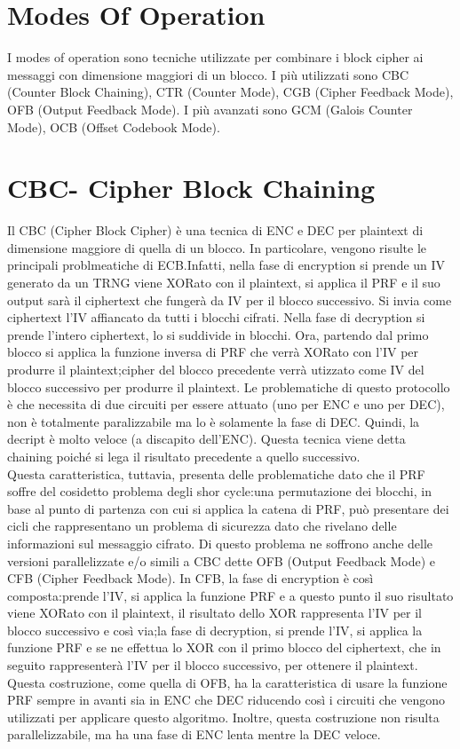 \documentclass[a4paper,draft]{article}
\begin{document}
\section{Modes Of Operation}
I modes of operation sono tecniche utilizzate per combinare i block cipher ai messaggi con dimensione maggiori di un blocco.\newline
I più utilizzati sono CBC (Counter Block Chaining), CTR (Counter Mode), CGB (Cipher Feedback Mode), OFB (Output Feedback Mode)\@. I più avanzati sono GCM (Galois Counter Mode), OCB (Offset Codebook Mode)\@.
\section{CBC- Cipher Block Chaining}
Il CBC (Cipher Block Cipher) è una tecnica di ENC e DEC per plaintext di dimensione maggiore di quella di un blocco. In particolare, vengono risulte le principali problmeatiche di ECB\@.Infatti, nella fase di encryption si prende un IV generato da un TRNG viene XORato con il plaintext, si applica il PRF e il suo output sarà il ciphertext che fungerà da IV per il blocco successivo. Si invia come ciphertext l'IV affiancato da tutti i blocchi cifrati\@. Nella fase di decryption si prende l'intero ciphertext, lo si suddivide in blocchi\@. Ora, partendo dal primo blocco si applica la funzione inversa di PRF che verrà XORato con l'IV per produrre il plaintext;\@il cipher del blocco precedente verrà utizzato come IV del blocco successivo per produrre il plaintext\@. Le problematiche di questo protocollo è che necessita di due circuiti per essere attuato (uno per ENC e uno per DEC), non è totalmente paralizzabile ma lo è solamente la fase di DEC\@. Quindi, la decript è molto veloce (a discapito dell'ENC)\@.\newline
Questa tecnica viene detta chaining poiché si lega il risultato precedente a quello successivo\@.\\
Questa caratteristica, tuttavia, presenta delle problematiche dato che il PRF soffre del cosidetto problema degli shor cycle:\@presa una permutazione dei blocchi, in base al punto di partenza con cui si applica la catena di PRF, può presentare dei cicli che rappresentano un problema di sicurezza dato che rivelano delle informazioni sul messaggio cifrato\@.\newline
Di questo problema ne soffrono anche delle versioni parallelizzate e/o simili a CBC dette OFB (Output Feedback Mode) e CFB (Cipher Feedback Mode)\@.\newline
In CFB, la fase di encryption è così composta:\@si prende l'IV, si applica la funzione PRF e a questo punto il suo risultato viene XORato con il plaintext, il risultato dello XOR rappresenta l'IV per il blocco successivo e così via;\@per la fase di decryption, si prende l'IV, si applica la funzione PRF e se ne effettua lo XOR con il primo blocco del ciphertext, che in seguito rappresenterà l'IV per il blocco successivo, per ottenere il plaintext\@. Questa costruzione, come quella di OFB, ha la caratteristica di usare la funzione PRF sempre in avanti sia in ENC che DEC riducendo così i circuiti che vengono utilizzati per applicare questo algoritmo\@. Inoltre, questa costruzione non risulta parallelizzabile, ma ha una fase di ENC lenta mentre la DEC veloce\@.\newline
\end{document}
